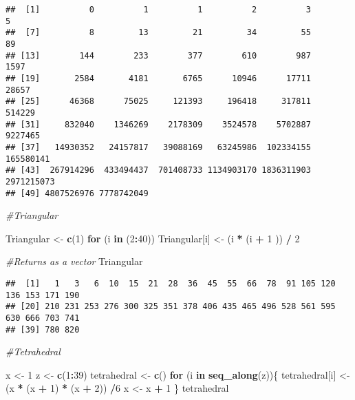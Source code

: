 \documentclass[
]{article}
\newenvironment{Shaded}{\begin{snugshade}}{\end{snugshade}}
\newcommand{\CommentTok}[1]{\textcolor[rgb]{0.56,0.35,0.01}{\textit{#1}}}
\newcommand{\ControlFlowTok}[1]{\textcolor[rgb]{0.13,0.29,0.53}{\textbf{#1}}}
\newcommand{\DecValTok}[1]{\textcolor[rgb]{0.00,0.00,0.81}{#1}}
\newcommand{\KeywordTok}[1]{\textcolor[rgb]{0.13,0.29,0.53}{\textbf{#1}}}
\newcommand{\NormalTok}[1]{#1}
\newcommand{\OperatorTok}[1]{\textcolor[rgb]{0.81,0.36,0.00}{\textbf{#1}}}
\newcommand{\StringTok}[1]{\textcolor[rgb]{0.31,0.60,0.02}{#1}}
\begin{document}
\begin{verbatim}
##  [1]          0          1          1          2          3          5
##  [7]          8         13         21         34         55         89
## [13]        144        233        377        610        987       1597
## [19]       2584       4181       6765      10946      17711      28657
## [25]      46368      75025     121393     196418     317811     514229
## [31]     832040    1346269    2178309    3524578    5702887    9227465
## [37]   14930352   24157817   39088169   63245986  102334155  165580141
## [43]  267914296  433494437  701408733 1134903170 1836311903 2971215073
## [49] 4807526976 7778742049
\end{verbatim}

\begin{Shaded}
\begin{Highlighting}[]
\CommentTok{#Triangular}

\NormalTok{Triangular <-}\StringTok{ }\KeywordTok{c}\NormalTok{(}\DecValTok{1}\NormalTok{) }
\ControlFlowTok{for}\NormalTok{ (i }\ControlFlowTok{in}\NormalTok{ (}\DecValTok{2}\OperatorTok{:}\DecValTok{40}\NormalTok{))}
\NormalTok{  Triangular[i] <-}\StringTok{ }\NormalTok{(i }\OperatorTok{*}\StringTok{ }\NormalTok{(i }\OperatorTok{+}\StringTok{ }\DecValTok{1}\NormalTok{ )) }\OperatorTok{/}\StringTok{ }\DecValTok{2}
  
\CommentTok{#Returns as a vector}
\NormalTok{  Triangular}
\end{Highlighting}
\end{Shaded}

\begin{verbatim}
##  [1]   1   3   6  10  15  21  28  36  45  55  66  78  91 105 120 136 153 171 190
## [20] 210 231 253 276 300 325 351 378 406 435 465 496 528 561 595 630 666 703 741
## [39] 780 820
\end{verbatim}

\begin{Shaded}
\begin{Highlighting}[]
\CommentTok{#Tetrahedral}

\NormalTok{x <-}\StringTok{ }\DecValTok{1}
\NormalTok{z <-}\StringTok{ }\KeywordTok{c}\NormalTok{(}\DecValTok{1}\OperatorTok{:}\DecValTok{39}\NormalTok{)}
\NormalTok{tetrahedral <-}\StringTok{ }\KeywordTok{c}\NormalTok{()}
\ControlFlowTok{for}\NormalTok{ (i }\ControlFlowTok{in} \KeywordTok{seq_along}\NormalTok{(z))\{}
\NormalTok{  tetrahedral[i] <-}\StringTok{ }\NormalTok{(x }\OperatorTok{*}\StringTok{ }\NormalTok{(x }\OperatorTok{+}\StringTok{ }\DecValTok{1}\NormalTok{) }\OperatorTok{*}\StringTok{ }\NormalTok{(x }\OperatorTok{+}\StringTok{ }\DecValTok{2}\NormalTok{)) }\OperatorTok{/}\DecValTok{6}
\NormalTok{  x <-}\StringTok{ }\NormalTok{x }\OperatorTok{+}\StringTok{ }\DecValTok{1}
\NormalTok{\}}
\NormalTok{tetrahedral}
\end{Highlighting}
\end{Shaded}
\end{document}
